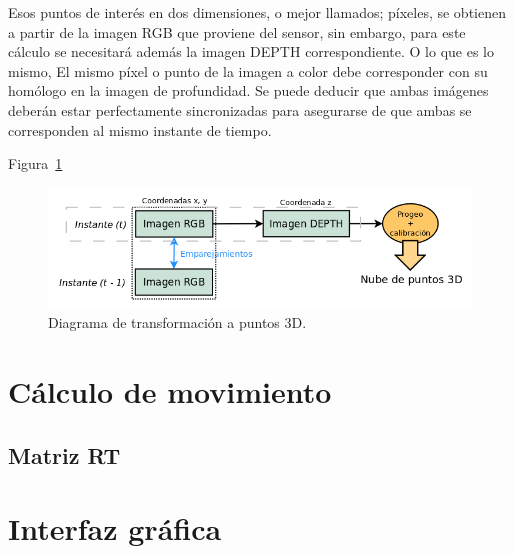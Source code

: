 Esos puntos de interés en dos dimensiones, o mejor llamados; píxeles, se obtienen a partir de la imagen RGB que proviene del sensor, sin embargo, para este cálculo se necesitará además la imagen DEPTH correspondiente. O lo que es lo mismo, El mismo píxel o punto de la imagen a color debe corresponder con su homólogo en la imagen de profundidad. Se puede deducir que ambas imágenes deberán estar perfectamente sincronizadas para asegurarse de que ambas se corresponden al mismo instante de tiempo.

Figura~\ref{fig:diagramPoints3d}

\begin{figure}[th]
\centering
\includegraphics[scale=0.4]{Figures/diagram-points-3d.png}
\decoRule
\caption[diagram-points-3d]{Diagrama de transformación a puntos 3D.}
\label{fig:diagramPoints3d}
\end{figure}

\section{Cálculo de movimiento}



\subsection{Matriz RT}

\section{Interfaz gráfica}